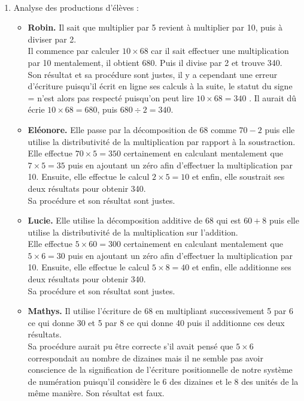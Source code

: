 \ \\ [-5mm]
\begin{enumerate}
   \item Analyse des productions d'élèves :
   \begin{itemize}
      \item {\bf Robin.} Il sait que multiplier par 5 revient à multiplier par 10, puis à diviser par 2. \\
      Il commence par calculer $10\times68$ car il sait effectuer une multiplication par 10 mentalement, il obtient 680. Puis il divise par 2 et trouve 340. \\
      Son résultat et sa procédure sont justes, il y a cependant une erreur d'écriture puisqu'il écrit en ligne ses calculs à la suite, le statut du signe \og = \fg{} n'est alors pas respecté puisqu'on peut lire \og $10\times68 =340$ \fg. Il aurait dû écrie $10\times68 =680$, puis $680\div2 =340$.
      \item {\bf Eléonore.} Elle passe par la décomposition de 68 comme $70-2$ puis elle utilise la distributivité de la multiplication par rapport à la soustraction. \\
      Elle effectue $70\times5 =350$ certainement en calculant mentalement que $7\times5 =35$ puis en \og ajoutant un zéro \fg{} afin d'effectuer la multiplication par 10. Ensuite, elle effectue le calcul $2\times 5 =10$ et enfin, elle soustrait ses deux résultats pour obtenir 340. \\
      Sa procédure et son résultat sont justes.
      \item {\bf Lucie.} Elle utilise la décomposition additive de 68 qui est $60+8$ puis elle utilise la distributivité de la multiplication sur l'addition. \\
      Elle effectue $5\times60 =300$ certainement en calculant mentalement que $5\times6 =30$ puis en \og ajoutant un zéro \fg{} afin d'effectuer la multiplication par 10. Ensuite, elle effectue le calcul $5\times8 =40$ et enfin, elle additionne ses deux résultats pour obtenir 340. \\
      Sa procédure et son résultat sont justes.
      \item {\bf Mathys.} Il utilise l'écriture de 68 en multipliant successivement 5 par 6 ce qui donne 30 et 5 par 8 ce qui donne 40 puis il additionne ces deux résultats. \\
      Sa procédure aurait pu être correcte s'il avait pensé que $5\times6$ correspondait au nombre de dizaines mais il ne semble pas avoir conscience de la signification de l'écriture positionnelle de notre système de numération puisqu'il considère le 6 des dizaines et le 8 des unités de la même manière. Son résultat est faux.

\end{itemize}
\end{enumerate}
